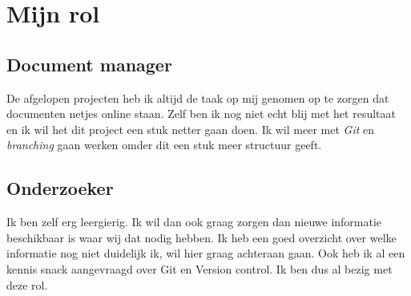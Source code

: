 \documentclass{article}
\begin{document}
\newpage

\section{Mijn rol}

\subsection{Document manager}

De afgelopen projecten heb ik altijd de taak op mij genomen op te zorgen dat documenten netjes online staan.
Zelf ben ik nog niet echt blij met het resultaat en ik wil het dit project een stuk netter gaan doen.
Ik wil meer met \emph{Git} en \emph{branching} gaan werken omder dit een stuk meer structuur geeft.

\subsection{Onderzoeker}
Ik ben zelf erg leergierig.
Ik wil dan ook graag zorgen dan nieuwe informatie beschikbaar is waar wij dat nodig hebben.
Ik heb een goed overzicht over welke informatie nog niet duidelijk ik, wil hier graag achteraan gaan. 
Ook heb ik al een kennis snack aangevraagd over Git en Version control.
Ik ben dus al bezig met deze rol.
\end{document}

